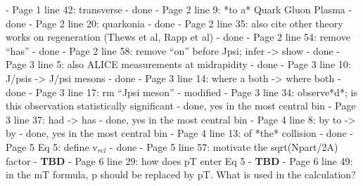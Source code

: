 \documentclass[a4paper,11pt]{article}
\begin{document}
- Page 1 line 42: transverse \newline
- {\color{blue} done} \newline
- Page 2 line 9: *to a* Quark Gluon Plasma \newline 
- {\color{blue} done} \newline
- Page 2 line 20: quarkonia \newline
- {\color{blue} done} \newline
- Page 2 line 35: also cite other theory works on regeneration (Thews et al, Rapp et al) \newline
- {\color{blue} done} \newline
- Page 2 line 54: remove “has” \newline
- {\color{blue} done} \newline
- Page 2 line 58: remove “on” before Jpsi; infer -> show \newline
- {\color{blue} done} \newline
- Page 3 line 5: also ALICE measurements at midrapidity \newline 
- {\color{blue} done} \newline
- Page 3 line 10: J/psis -> J/psi mesons \newline
- {\color{blue} done} \newline
- Page 3 line 14: where a both -> where both \newline
- {\color{blue} done} \newline
- Page 3 line 17: rm “Jpsi meson” \newline
- {\color{blue} modified} \newline
- Page 3 line 34: observe*d*; is this observation statistically significant \newline
- {\color{blue} done, yes in the most central bin}
- Page 3 line 37: had -> has \newline
- {\color{blue} done, yes in the most central bin}
- Page 4 line 8: by to -> by \newline
- {\color{blue} done, yes in the most central bin}
- Page 4 line 13: of *the* collision \newline
- {\color{blue} done}
- Page 5 Eq 5: define v$_{rel}$ \newline
- {\color{blue} done}
- Page 5 line 57: motivate the sqrt(Npart/2A) factor \newline
- {\color{red} \textbf{TBD}}
- Page 6 line 29: how does pT enter Eq 5 \newline
- {\color{red} \textbf{TBD}}
- Page 6 line 49: in the mT formula, p should be replaced by pT. What is used in the calculation? \newline
\end{document}
